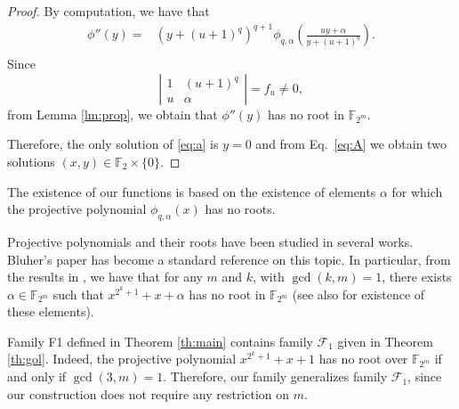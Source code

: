 \documentclass{article}
\newcommand{\cF}{\mathcal{F}}
\begin{document}
\begin{proof}
By computation, we have that 
$$
\begin{aligned}
\phi''(y)=&(y+(u+1)^q)^{q+1}\phi_{q,\alpha}\left(\frac{uy+\alpha}{y+(u+1)^q}\right).\\
\end{aligned}
$$
Since 
$$
\left|
\begin{array}{cc}
  1   & (u+1)^q \\
 u    & \alpha
\end{array}\right|=f_u\ne 0,
$$
from Lemma \ref{lm:prop}, we obtain that $\phi''(y)$ has no root in $\mathbb{F}_{2^m}$.

Therefore, the only solution of \eqref{eq:a} is $y=0$ and from Eq.\ \eqref{eq:A} we obtain two solutions $(x,y)\in\mathbb{F}_2\times\{0\}$.
\end{proof}


The existence of our functions is based on the existence of elements $\alpha$ for which the projective polynomial $\phi_{q,\alpha}(x)$ has no roots.

Projective polynomials and their roots have been studied in several works. Bluher's paper \cite{BLU} has become a standard reference on this topic. In particular, from the results in  \cite{BLU}, we have that for any $m$ and $k$, with $\gcd(k,m)=1$, there exists $\alpha\in \mathbb{F}_{2^m}$ such that $x^{2^k+1}+x+\alpha$ has no root in $\mathbb{F}_{2^m}$ (see also \cite{HK} for existence of these elements).

Family F1 defined in Theorem \ref{th:main} contains family $\mathcal{F}_1$ given in Theorem \ref{th:gol}. Indeed, the projective polynomial $x^{2^k+1}+x+1$ has no root over $\mathbb{F}_{2^m}$ if and only if $\gcd(3,m)=1$. Therefore, our family generalizes family $\cF_1$, since our construction does not require any restriction on $m$.
\end{document}

